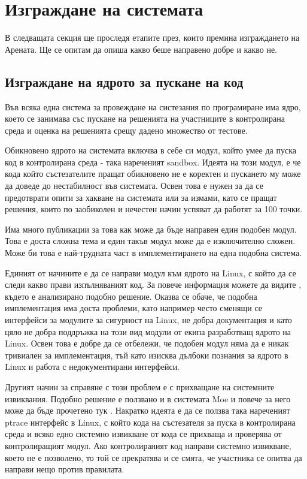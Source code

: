\documentclass[a4paper,12pt]{article}
\begin{document}
  \section{Изграждане на системата}
  В следващата секция ще проследя етапите през, които премина изграждането на
  Арената. Ще се опитам да опиша какво беше направено добре и какво не.
  \subsection{Изграждане на ядрото за пускане на код}
  Във всяка една система за провеждане на систезания по програмиране има ядро,
  което се занимава със пускане на решенията на участниците в контролирана среда
  и оценка на решенията срещу дадено множество от тестове.

  Обикновено ядрото на системата включва в себе си модул, който умее да пуска код в контролирана среда - така нареченият sandbox. Идеята на този модул, е че кода който състезателите пращат обикновено не е коректен и пускането му може да доведе до нестабилност във системата. Освен това е нужен за да се предотврати опити за хакване на системата или за измами, като се пращат решения, които по заобиколен и нечестен начин успяват да работят за 100 точки.
  
  Има много публикации за това как може да бъде направен един подобен модул. Това е доста сложна тема и един такъв модул може да е изключително сложен. Може би това е най-трудната част в имплементирането на една подобна система.
  
  Единият от начините е да се направи модул към ядрото на Linux, с който да се следи какво прави изпълняваният код. За повече информация можете да видите \cite{linux_sec_module_sandbox}, където е анализирано подобно решение. Оказва се обаче, че подобна имплементация има доста проблеми, като например често сменящи се интерфейси за модулите за сигурност на Linux, не добра документация и като цяло не добра поддръжка на този вид модули от екипа разработващ ядрото на Linux. Освен това е добре да се отбележи, че подобен модул няма да е никак тривиален за имплементация, тъй като изисква дълбоки познания за ядрото в Linux и работа с недокументирани интерфейси.
  
  Другият начин за справяне с този проблем е с прихващане на системните извиквания. Подобно решение е ползвано и в системата Moe и повече за него може да бъде прочетено тук \cite{perspectives_grading_systems}. Накратко идеята е да се ползва така нареченият ptrace интерфейс в Linux, с който кода на състезателя за пуска в контролирана среда и всяко едно системно извикване от кода се прихваща и проверява от контролиращият модул. Ако контролираният код направи системно извикване, което не е позволено, то той се прекратява и се смята, че участника се опитва да направи нещо против правилата.
  
\end{document}

